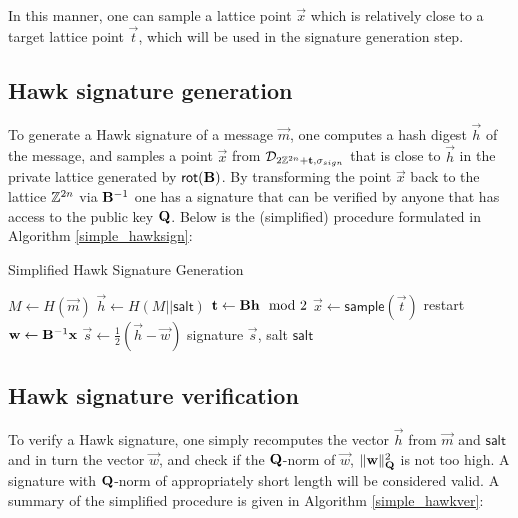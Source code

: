 In this manner, one can sample a lattice point $\vec{x}$ which is relatively close to a target lattice point $\vec{t}$, which will be used in the signature generation step.

\subsection{Hawk signature generation}
To generate a Hawk signature of a message $\vec{m}$, one computes a hash digest $\vec{h}$ of the message, and samples a point $\vec{x}$ from $\mathcal{D}_{2\mathbb{Z}^{2n} + \mathbf{t}, \sigma_{sign}}$ that is close to $\vec{h}$ in the 
private lattice generated by $\mathsf{rot}(\mathbf{B})$. By transforming the point $\vec{x}$ back to the lattice $\mathbb{Z}^{2n}$ via $\mathbf{B}^{-1}$ one has a signature that can be verified 
by anyone that has access to the public key $\mathbf{Q}$.
Below is the (simplified) procedure formulated in Algorithm \ref{simple_hawksign}:
\begin{algorithm}
    \caption{Simplified Hawk Signature Generation}\label{simple_hawksign}
\begin{algorithmic}[1]
    \State $M \gets H(\vec{m})$ 
    \State $\vec{h} \gets H(M || \mathsf{salt})$ 
    \State $\mathbf{t} \gets \mathbf{B} \mathbf{h} \mod 2$ 
    \State $\vec{x} \gets \mathsf{sample}(\vec{t})$
    \State restart
    \Else
    \State $\mathbf{w} \gets \mathbf{B}^{-1} \mathbf{x}$
    \State $\vec{s} \gets \frac{1}{2}(\vec{h} - \vec{w})$
    \State \Return signature $\vec{s}$, salt $\mathsf{salt}$
    \EndIf
\end{algorithmic}
\end{algorithm}
\subsection{Hawk signature verification}
To verify a Hawk signature, one simply recomputes the vector $\vec{h}$ from $\vec{m}$ and $\mathsf{salt}$ and in turn the vector $\vec{w}$, and check if the $\mathbf{Q}$-norm of $\vec{w}$,
$\lVert \mathbf{w} \rVert_{\mathbf{Q}}^2$ is not too high. A signature with $\mathbf{Q}$-norm of appropriately short length will be considered valid.
A summary of the simplified procedure is given in Algorithm \ref{simple_hawkver}:

